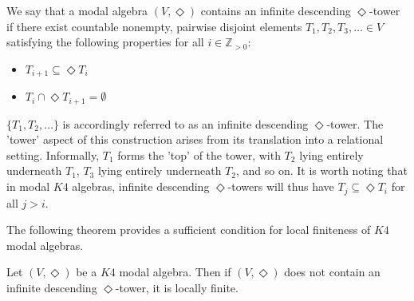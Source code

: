 \documentclass[submission]{eptcs}
\begin{document}
\begin{definition} \label{def:diamond_tower}
    We say that a modal algebra $(V,\Diamond)$ contains an infinite descending $\Diamond$-tower if there exist countable nonempty, pairwise disjoint elements  $T_1,T_2,T_3,\dots \in V$ satisfying the following properties for all $i \in \mathbb{Z}_{>0}$:
    \begin{itemize}
        \item [(i)] $T_{i+1} \subseteq \Diamond T_i$
        \item [(ii)] $T_i \cap \Diamond T_{i+1}=\emptyset$
    \end{itemize}
\end{definition}

$\{T_1,T_2,\dots\}$ is accordingly referred to as an infinite descending $\Diamond$-tower.
The 'tower' aspect of this construction arises from its translation into a relational setting. Informally, $T_1$ forms the 'top' of the tower, with $T_2$ lying entirely underneath $T_1$, $T_3$ lying entirely underneath $T_2$, and so on. 
It is worth noting that in modal $K4$ algebras, infinite descending $\Diamond$-towers will thus have $T_j\subseteq\Diamond T_i$ for all $j>i$.
\par
The following theorem provides a sufficient condition for local finiteness of $K4$ modal algebras.

\begin{theorem} \label{thm:no_tower_implies_locally_finite}
    Let $(V,\Diamond)$ be a $K4$ modal algebra.
    Then if $(V,\Diamond)$ does not contain an infinite descending $\Diamond$-tower, it is locally finite.
\end{theorem}
\end{document}

